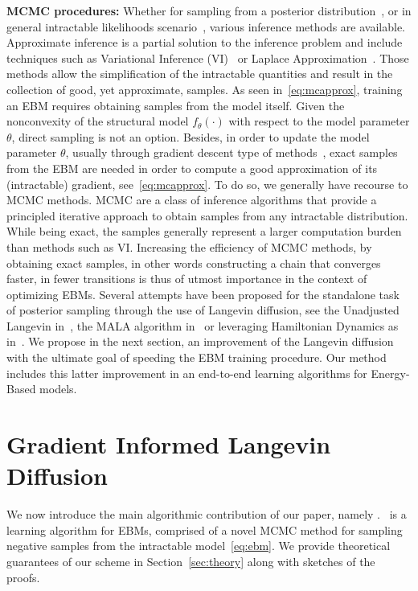 \documentclass[letterpaper]{article} %
\begin{document}
\vspace{0.05in}\noindent\textbf{MCMC procedures: }
Whether for sampling from a posterior distribution~\cite{mh:robert}, or in general intractable likelihoods scenario~\cite{doucet2000sequential}, various inference methods are available.
Approximate inference is a partial solution to the inference problem and include techniques such as Variational Inference (VI)~\cite{jordanvi,freitas} or Laplace Approximation~\cite{wolfinger,rue2009approximate}. 
Those methods allow the simplification of the intractable quantities and result in the collection of good, yet approximate, samples.
As seen in~\eqref{eq:mcapprox}, training an EBM requires obtaining samples from the model itself.
Given the nonconvexity of the structural model $f_\theta(\cdot)$ with respect to the model parameter $\theta$, direct sampling is not an option.
Besides, in order to update the model parameter $\theta$, usually through gradient descent type of methods~\cite{bottou2008},  exact samples from the EBM are needed in order to compute a good approximation of its (intractable) gradient, see~\eqref{eq:mcapprox}.
To do so, we generally have recourse to MCMC methods.
MCMC are a class of inference algorithms that provide a principled iterative approach to obtain samples from any intractable distribution.
While being exact, the samples generally represent a larger computation burden than methods such as VI.
Increasing the efficiency of MCMC methods, by obtaining exact samples, in other words constructing a chain that converges faster, in fewer transitions is thus of utmost importance in the context of optimizing EBMs.
Several attempts have been proposed for the standalone task of posterior sampling through the use of Langevin diffusion, see the Unadjusted Langevin in~\citet{brosse2017tamed}, the MALA algorithm in~\citet{roberts,robertsmala,durmus2017fast} or leveraging Hamiltonian Dynamics as in~\citet{girolami2011riemann}.
We propose in the next section, an improvement of the Langevin diffusion with the ultimate goal of speeding the EBM training procedure.
Our method includes this latter improvement in an end-to-end learning algorithms for Energy-Based models.

\section{Gradient Informed Langevin Diffusion}\label{sec:main}

We now introduce the main algorithmic contribution of our paper, namely \algo.
\algo\ is a learning algorithm for EBMs, comprised of a novel MCMC method for sampling negative samples from the intractable model~\eqref{eq:ebm}.
We provide theoretical guarantees of our scheme in Section~\ref{sec:theory} along with sketches of the proofs.
\end{document}

